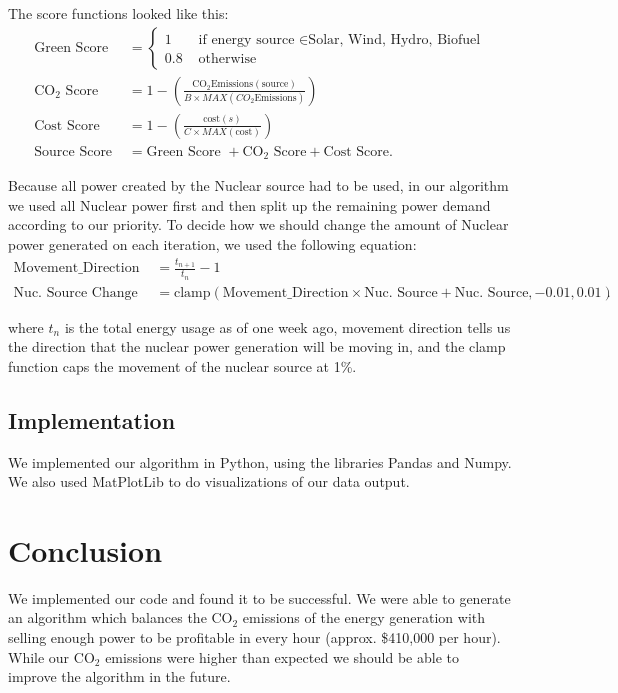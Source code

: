\documentclass[article]{report} %
\begin{document}
    The score functions looked like this:
    \begin{align*}
	    \text{Green Score } &= \begin{cases}
		1 & \text{ if energy source } \in  \text{Solar, Wind, Hydro, Biofuel} \\
		0.8 & \text{ otherwise}
    	\end{cases} \\
		    \text{CO}_{2} \text{ Score} &= 1 - \left( \frac{\text{CO}_{2} \text{Emissions}\left( \text{source} \right) }{B \times MAX \left( CO_{2} \text{Emissions} \right) } \right) \\ %
		    \text{Cost Score} &= 1 - \left( \frac{\text{cost}\left( s \right) }{C \times  MAX \left( \text{cost} \right) } \right) \\
		    \text{Source Score } &=  \text{Green Score } + \text{CO}_{2} \text{ Score} + \text{Cost Score}
    .\end{align*}
    
    Because all power created by the Nuclear source had to be used, in our algorithm we used all Nuclear power first and then split up the remaining power demand according to our priority. To decide how we should change the amount of Nuclear power generated on each iteration, we used the following equation:
    \begin{align*}
	    \text{Movement\_Direction } &= \frac{t_{n + 1} }{t_{n}} - 1 \\
	    \text{Nuc. Source Change } &= \text{clamp} 
	    \left( \text{Movement\_Direction}  \times \text{Nuc. Source} + \text{Nuc. Source}, -0.01, 0.01 \right)  
    .\end{align*}

    where $t_{n}$ is the total energy usage as of one week ago, movement direction tells us the direction that the nuclear power generation will be moving in, and the clamp function caps the movement of the nuclear source at 1\%.

    \subsection{Implementation}
    We implemented our algorithm in Python, using the libraries Pandas and Numpy. We also used MatPlotLib to do visualizations of our data output. 

    \section{Conclusion}
    We implemented our code and found it to be successful. We were able to generate an algorithm which balances the CO$_{2}$ emissions of the energy generation with selling enough power to be profitable in every hour (approx. \$410,000 per hour). While our CO$_{2}$ emissions were higher than expected we should be able to improve the algorithm in the future. 
\end{document}
